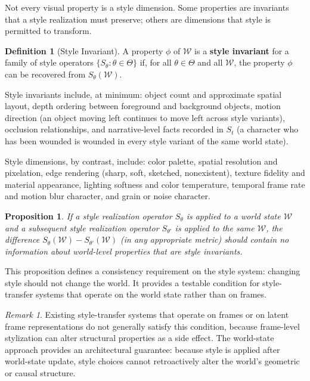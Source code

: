 \documentclass[12pt,a4paper]{article}
\theoremstyle{plain}
\newtheorem{proposition}[theorem]{Proposition}
\theoremstyle{definition}
\newtheorem{definition}[theorem]{Definition}
\theoremstyle{remark}
\newtheorem{remark}[theorem]{Remark}
\begin{document}
Not every visual property is a style dimension. Some properties are invariants that a style realization must preserve; others are dimensions that style is permitted to transform.

\begin{definition}[Style Invariant]
A property $\phi$ of $\mathcal{W}$ is a \textbf{style invariant} for a family of style operators $\{S_\theta : \theta \in \Theta\}$ if, for all $\theta \in \Theta$ and all $\mathcal{W}$, the property $\phi$ can be recovered from $S_\theta(\mathcal{W})$.
\end{definition}

Style invariants include, at minimum: object count and approximate spatial layout, depth ordering between foreground and background objects, motion direction (an object moving left continues to move left across style variants), occlusion relationships, and narrative-level facts recorded in $S_t$ (a character who has been wounded is wounded in every style variant of the same world state).

Style dimensions, by contrast, include: color palette, spatial resolution and pixelation, edge rendering (sharp, soft, sketched, nonexistent), texture fidelity and material appearance, lighting softness and color temperature, temporal frame rate and motion blur character, and grain or noise character.

\begin{proposition}
If a style realization operator $S_\theta$ is applied to a world state $\mathcal{W}$ and a subsequent style realization operator $S_{\theta'}$ is applied to the same $\mathcal{W}$, the difference $S_\theta(\mathcal{W}) - S_{\theta'}(\mathcal{W})$ (in any appropriate metric) should contain no information about world-level properties that are style invariants.
\end{proposition}

This proposition defines a consistency requirement on the style system: changing style should not change the world. It provides a testable condition for style-transfer systems that operate on the world state rather than on frames.

\begin{remark}
Existing style-transfer systems that operate on frames or on latent frame representations do not generally satisfy this condition, because frame-level stylization can alter structural properties as a side effect. The world-state approach provides an architectural guarantee: because style is applied after world-state update, style choices cannot retroactively alter the world's geometric or causal structure.
\end{remark}
\end{document}
